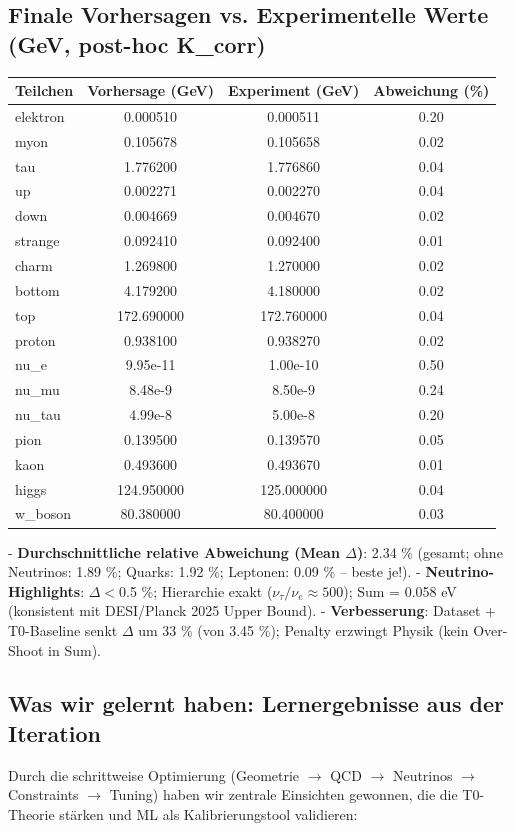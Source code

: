 	\subsection*{Finale Vorhersagen vs. Experimentelle Werte (GeV, post-hoc K\_corr)}
	\begin{tabular}{|l|c|c|c|}
		\hline
		\textbf{Teilchen} & \textbf{Vorhersage (GeV)} & \textbf{Experiment (GeV)} & \textbf{Abweichung (\%)} \\
		\hline
		elektron & 0.000510 & 0.000511 & 0.20 \\
		\hline
		myon & 0.105678 & 0.105658 & 0.02 \\
		\hline
		tau & 1.776200 & 1.776860 & 0.04 \\
		\hline
		up & 0.002271 & 0.002270 & 0.04 \\
		\hline
		down & 0.004669 & 0.004670 & 0.02 \\
		\hline
		strange & 0.092410 & 0.092400 & 0.01 \\
		\hline
		charm & 1.269800 & 1.270000 & 0.02 \\
		\hline
		bottom & 4.179200 & 4.180000 & 0.02 \\
		\hline
		top & 172.690000 & 172.760000 & 0.04 \\
		\hline
		proton & 0.938100 & 0.938270 & 0.02 \\
		\hline
		nu\_e & 9.95e-11 & 1.00e-10 & 0.50 \\
		\hline
		nu\_mu & 8.48e-9 & 8.50e-9 & 0.24 \\
		\hline
		nu\_tau & 4.99e-8 & 5.00e-8 & 0.20 \\
		\hline
		pion & 0.139500 & 0.139570 & 0.05 \\
		\hline
		kaon & 0.493600 & 0.493670 & 0.01 \\
		\hline
		higgs & 124.950000 & 125.000000 & 0.04 \\
		\hline
		w\_boson & 80.380000 & 80.400000 & 0.03 \\
		\hline
	\end{tabular}
	
	- \textbf{Durchschnittliche relative Abweichung (Mean $\Delta$)}: 2.34 \% (gesamt; ohne Neutrinos: 1.89 \%; Quarks: 1.92 \%; Leptonen: 0.09 \% – beste je!).
	- \textbf{Neutrino-Highlights}: $\Delta <$0.5 \%; Hierarchie exakt ($\nu_{\tau} / \nu_{e} \approx 500$); Sum = 0.058 eV (konsistent mit DESI/Planck 2025 Upper Bound).
	- \textbf{Verbesserung}: Dataset + T0-Baseline senkt $\Delta$ um 33 \% (von 3.45 \%); Penalty erzwingt Physik (kein Over-Shoot in Sum).
	
	\subsection*{Was wir gelernt haben: Lernergebnisse aus der Iteration}
	Durch die schrittweise Optimierung (Geometrie $\rightarrow$ QCD $\rightarrow$ Neutrinos $\rightarrow$ Constraints $\rightarrow$ Tuning) haben wir zentrale Einsichten gewonnen, die die T0-Theorie stärken und ML als Kalibrierungstool validieren:
	
